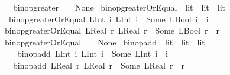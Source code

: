 \begin{isabellebody}
\ \ {\isacharbar}{\kern0pt}\ {\isachardoublequoteopen}binop{\isacharunderscore}{\kern0pt}greater\ {\isacharunderscore}{\kern0pt}\ {\isacharunderscore}{\kern0pt}\ {\isacharequal}{\kern0pt}\ None{\isachardoublequoteclose}\isanewline
\isanewline
{}\isamarkupfalse%
\ binop{\isacharunderscore}{\kern0pt}greaterOrEqual\ {\isacharcolon}{\kern0pt}{\isacharcolon}{\kern0pt}\ {\isachardoublequoteopen}lit\ {\isasymRightarrow}\ lit\ {\isasymrightharpoonup}\ lit{\isachardoublequoteclose}\isanewline
{}\isanewline
\ \ {\isachardoublequoteopen}binop{\isacharunderscore}{\kern0pt}greaterOrEqual\ {\isacharparenleft}{\kern0pt}LInt\ i{}{\isacharparenright}{\kern0pt}\ {\isacharparenleft}{\kern0pt}LInt\ i{}{\isacharparenright}{\kern0pt}\ {\isacharequal}{\kern0pt}\ Some\ {\isacharparenleft}{\kern0pt}LBool\ {\isacharparenleft}{\kern0pt}i{}\ {\isasymge}\ i{}{\isacharparenright}{\kern0pt}{\isacharparenright}{\kern0pt}{\isachardoublequoteclose}\isanewline
{\isacharbar}{\kern0pt}\ {\isachardoublequoteopen}binop{\isacharunderscore}{\kern0pt}greaterOrEqual\ {\isacharparenleft}{\kern0pt}LReal\ r{}{\isacharparenright}{\kern0pt}\ {\isacharparenleft}{\kern0pt}LReal\ r{}{\isacharparenright}{\kern0pt}\ {\isacharequal}{\kern0pt}\ Some\ {\isacharparenleft}{\kern0pt}LBool\ {\isacharparenleft}{\kern0pt}r{}\ {\isasymge}\ r{}{\isacharparenright}{\kern0pt}{\isacharparenright}{\kern0pt}{\isachardoublequoteclose}\isanewline
{\isacharbar}{\kern0pt}\ {\isachardoublequoteopen}binop{\isacharunderscore}{\kern0pt}greaterOrEqual\ {\isacharunderscore}{\kern0pt}\ {\isacharunderscore}{\kern0pt}\ {\isacharequal}{\kern0pt}\ None{\isachardoublequoteclose}\isanewline
\isanewline
{}\isamarkupfalse%
\ binop{\isacharunderscore}{\kern0pt}add\ {\isacharcolon}{\kern0pt}{\isacharcolon}{\kern0pt}\ {\isachardoublequoteopen}lit\ {\isasymRightarrow}\ lit\ {\isasymrightharpoonup}\ lit{\isachardoublequoteclose}\isanewline
\ \ \ \isanewline
\ \ \ \ {\isachardoublequoteopen}binop{\isacharunderscore}{\kern0pt}add\ {\isacharparenleft}{\kern0pt}LInt\ i{}{\isacharparenright}{\kern0pt}\ {\isacharparenleft}{\kern0pt}LInt\ i{}{\isacharparenright}{\kern0pt}\ {\isacharequal}{\kern0pt}\ Some\ {\isacharparenleft}{\kern0pt}LInt\ {\isacharparenleft}{\kern0pt}i{}\ {\isacharplus}{\kern0pt}\ i{}{\isacharparenright}{\kern0pt}{\isacharparenright}{\kern0pt}{\isachardoublequoteclose}\isanewline
\ \ {\isacharbar}{\kern0pt}\ {\isachardoublequoteopen}binop{\isacharunderscore}{\kern0pt}add\ {\isacharparenleft}{\kern0pt}LReal\ r{}{\isacharparenright}{\kern0pt}\ {\isacharparenleft}{\kern0pt}LReal\ r{}{\isacharparenright}{\kern0pt}\ {\isacharequal}{\kern0pt}\ Some\ {\isacharparenleft}{\kern0pt}LReal\ {\isacharparenleft}{\kern0pt}r{}\ {\isacharplus}{\kern0pt}\ r{}{\isacharparenright}{\kern0pt}{\isacharparenright}{\kern0pt}{\isachardoublequoteclose}\isanewline

\end{isabellebody}
